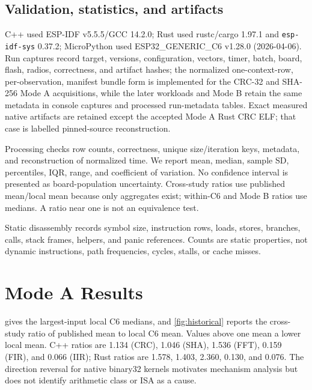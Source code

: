 \documentclass[10pt]{article}
\begin{document}
\subsection{Validation, statistics, and artifacts}
C++ used ESP-IDF v5.5.5/GCC 14.2.0; Rust used rustc/cargo 1.97.1 and \texttt{esp-idf-sys} 0.37.2; MicroPython used ESP32\_GENERIC\_C6 v1.28.0 (2026-04-06). Run captures record target, versions, configuration, vectors, timer, batch, board, flash, radios, correctness, and artifact hashes; the normalized one-context-row, per-observation, manifest bundle form is implemented for the CRC-32 and SHA-256 Mode A acquisitions, while the later workloads and Mode B retain the same metadata in console captures and processed run-metadata tables. Exact measured native artifacts are retained except the accepted Mode A Rust CRC ELF; that case is labelled pinned-source reconstruction.

Processing checks row counts, correctness, unique size/iteration keys, metadata, and reconstruction of normalized time. We report mean, median, sample SD, percentiles, IQR, range, and coefficient of variation. No confidence interval is presented as board-population uncertainty. Cross-study ratios use published mean/local mean because only aggregates exist; within-C6 and Mode B ratios use medians. A ratio near one is not an equivalence test.

Static disassembly records symbol size, instruction rows, loads, stores, branches, calls, stack frames, helpers, and panic references. Counts are static properties, not dynamic instructions, path frequencies, cycles, stalls, or cache misses.

\section{Mode A Results}
\begin{table}[!htbp]
\centering\scriptsize
\caption{Largest-input local C6 medians. The language-consistent historical/local matrix is in the supplement; cross-study ratios appear in \cref{fig:historical}.}
\label{tab:headline}

\end{table}

 gives the largest-input local C6 medians, and \cref{fig:historical} reports the cross-study ratio of published mean to local C6 mean. Values above one mean a lower local mean. C++ ratios are 1.134 (CRC), 1.046 (SHA), 1.536 (FFT), 0.159 (FIR), and 0.066 (IIR); Rust ratios are 1.578, 1.403, 2.360, 0.130, and 0.076. The direction reversal for native binary32 kernels motivates mechanism analysis but does not identify arithmetic class or ISA as a cause.
\end{document}
